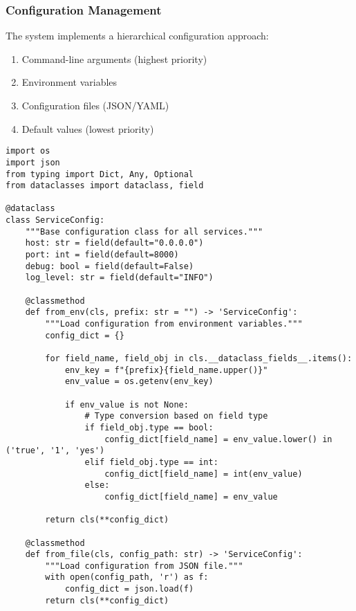 \subsubsection{Configuration Management}

The system implements a hierarchical configuration approach:

\begin{enumerate}
    \item Command-line arguments (highest priority)
    \item Environment variables
    \item Configuration files (JSON/YAML)
    \item Default values (lowest priority)
\end{enumerate}

\begin{lstlisting}[style=pythoncode, caption=Configuration Management Implementation]
import os
import json
from typing import Dict, Any, Optional
from dataclasses import dataclass, field

@dataclass
class ServiceConfig:
    """Base configuration class for all services."""
    host: str = field(default="0.0.0.0")
    port: int = field(default=8000)
    debug: bool = field(default=False)
    log_level: str = field(default="INFO")
    
    @classmethod
    def from_env(cls, prefix: str = "") -> 'ServiceConfig':
        """Load configuration from environment variables."""
        config_dict = {}
        
        for field_name, field_obj in cls.__dataclass_fields__.items():
            env_key = f"{prefix}{field_name.upper()}"
            env_value = os.getenv(env_key)
            
            if env_value is not None:
                # Type conversion based on field type
                if field_obj.type == bool:
                    config_dict[field_name] = env_value.lower() in ('true', '1', 'yes')
                elif field_obj.type == int:
                    config_dict[field_name] = int(env_value)
                else:
                    config_dict[field_name] = env_value
        
        return cls(**config_dict)
    
    @classmethod
    def from_file(cls, config_path: str) -> 'ServiceConfig':
        """Load configuration from JSON file."""
        with open(config_path, 'r') as f:
            config_dict = json.load(f)
        return cls(**config_dict)
    

\end{lstlisting}
